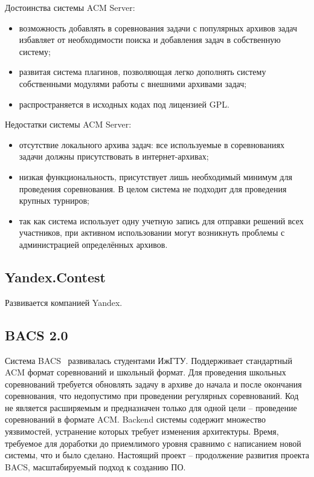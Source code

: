Достоинства системы ACM Server:
\begin{itemize}
    \item возможность добавлять в соревнования задачи с популярных архивов задач
        избавляет от необходимости поиска и добавления задач в собственную систему;
    \item развитая система плагинов, позволяющая легко дополнять систему
        собственными модулями работы с внешними архивами задач;
    \item распространяется в исходных кодах под лицензией GPL.
\end{itemize}

Недостатки системы ACM Server:
\begin{itemize}
    \item отсутствие локального архива задач:
        все используемые в соревнованиях задачи должны присутствовать в интернет-архивах;
    \item низкая функциональность, присутствует лишь необходимый минимум для проведения соревнования.
        В целом система не подходит для проведения крупных турниров;
    \item так как система использует одну учетную запись для отправки решений всех участников,
        при активном использовании могут возникнуть проблемы с администрацией определённых архивов.
\end{itemize}

\subsection{Yandex.Contest}
Развивается компанией Yandex.

\subsection{BACS 2.0}
Система BACS~\cite{bacs2} развивалась студентами ИжГТУ.
Поддерживает стандартный ACM формат соревнований и школьный формат.
Для проведения школьных соревнований требуется обновлять задачу в архиве до начала и после окончания соревнования,
что недопустимо при проведении регулярных соревнований.
Код не является расширяемым и предназначен только для одной цели -- проведение соревнований в формате ACM.
Backend системы содержит множество уязвимостей, устранение которых требует изменения архитектуры.
Время, требуемое для доработки до приемлимого уровня сравнимо с написанием новой системы, что и было сделано.
Настоящий проект -- продолжение развития проекта BACS, масштабируемый подход к созданию ПО.

